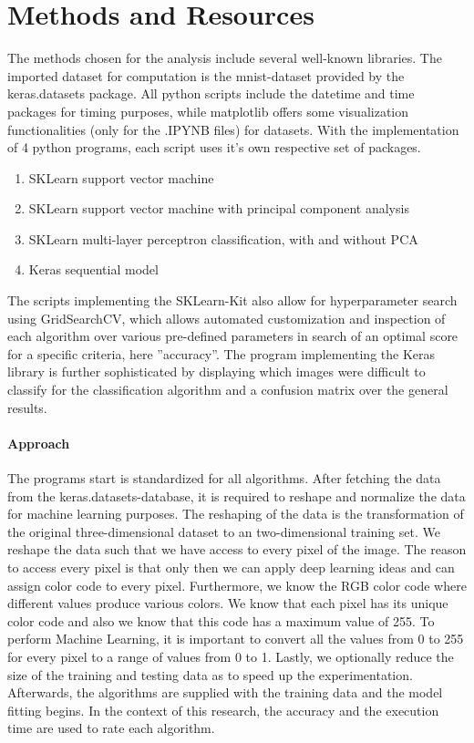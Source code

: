 \chapter{Methods and Resources}
The methods chosen for the analysis include several well-known libraries.
The imported dataset for computation is the mnist-dataset provided by the keras.datasets package.
All python scripts include the datetime and time packages for timing purposes, while matplotlib offers some visualization functionalities (only for the .IPYNB files) for datasets.
With the implementation of 4 python programs, each script uses it's own respective set of packages.
\begin{enumerate}
    \item SKLearn support vector machine
    \item SKLearn support vector machine with principal component analysis
    \item SKLearn multi-layer perceptron classification, with and without PCA
    \item Keras sequential model
\end{enumerate}

The scripts implementing the SKLearn-Kit also allow for hyperparameter search using GridSearchCV, which allows automated customization and inspection of each algorithm over various pre-defined parameters in search of an optimal score for a specific criteria, here ''accuracy''.
The program implementing the Keras library is further sophisticated by displaying which images were difficult to classify for the classification algorithm and a confusion matrix over the general results.

\subsubsection{Approach}
The programs start is standardized for all algorithms. After fetching the data from the keras.datasets-database, it is required to reshape and normalize the data for machine learning purposes.
The reshaping of the data is the transformation of the original three-dimensional dataset to an two-dimensional training set.
We reshape the data such that we have access to every pixel of the image. The reason to access every pixel is that only then we can apply deep learning ideas and can assign color code to every pixel.
Furthermore, we know the RGB color code where different values produce various colors. We know that each pixel has its unique color code and also we know that this code has a maximum value of 255. 
To perform Machine Learning, it is important to convert all the values from 0 to 255 for every pixel to a range of values from 0 to 1.
Lastly, we optionally reduce the size of the training and testing data as to speed up the experimentation.
Afterwards, the algorithms are supplied with the training data and the model fitting begins. In the context of this research, the accuracy and the execution time are used to rate each algorithm.
